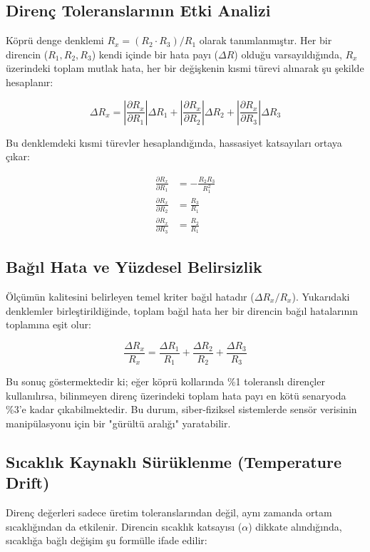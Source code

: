 \documentclass[12pt,a4paper]{article}
\begin{document}
\subsection{Direnç Toleranslarının Etki Analizi}
Köprü denge denklemi $R_x = (R_2 \cdot R_3) / R_1$ olarak tanımlanmıştır. Her bir direncin ($R_1, R_2, R_3$) kendi içinde bir hata payı ($\Delta R$) olduğu varsayıldığında, $R_x$ üzerindeki toplam mutlak hata, her bir değişkenin kısmi türevi alınarak şu şekilde hesaplanır:

\begin{equation}
    \Delta R_x = \left| \frac{\partial R_x}{\partial R_1} \right| \Delta R_1 + \left| \frac{\partial R_x}{\partial R_2} \right| \Delta R_2 + \left| \frac{\partial R_x}{\partial R_3} \right| \Delta R_3
\end{equation}

Bu denklemdeki kısmi türevler hesaplandığında, hassasiyet katsayıları ortaya çıkar:

\begin{align}
    \frac{\partial R_x}{\partial R_1} &= -\frac{R_2 R_3}{R_1^2} \\
    \frac{\partial R_x}{\partial R_2} &= \frac{R_3}{R_1} \\
    \frac{\partial R_x}{\partial R_3} &= \frac{R_2}{R_1}
\end{align}

\subsection{Bağıl Hata ve Yüzdesel Belirsizlik}
Ölçümün kalitesini belirleyen temel kriter bağıl hatadır ($\Delta R_x / R_x$). Yukarıdaki denklemler birleştirildiğinde, toplam bağıl hata her bir direncin bağıl hatalarının toplamına eşit olur:

\begin{equation}
    \frac{\Delta R_x}{R_x} = \frac{\Delta R_1}{R_1} + \frac{\Delta R_2}{R_2} + \frac{\Delta R_3}{R_3}
\end{equation}

Bu sonuç göstermektedir ki; eğer köprü kollarında \%1 toleranslı dirençler kullanılırsa, bilinmeyen direnç üzerindeki toplam hata payı en kötü senaryoda \%3'e kadar çıkabilmektedir. Bu durum, siber-fiziksel sistemlerde sensör verisinin manipülasyonu için bir "gürültü aralığı" yaratabilir.

\subsection{Sıcaklık Kaynaklı Sürüklenme (Temperature Drift)}
Direnç değerleri sadece üretim toleranslarından değil, aynı zamanda ortam sıcaklığından da etkilenir. Direncin sıcaklık katsayısı ($\alpha$) dikkate alındığında, sıcaklığa bağlı değişim şu formülle ifade edilir:
\end{document}
